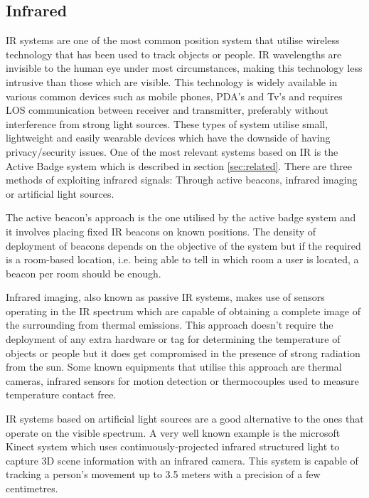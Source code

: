 \subsection{Infrared}
\label{subsec:ir}

\ac{IR} systems are one of the most common position system that utilise wireless technology that has been used to track objects or people. \ac{IR} wavelengths are invisible to the human eye under most circumstances, making this technology less intrusive than those which are visible. This technology is widely available in various common devices such as mobile phones, PDA's and Tv's and requires \ac{LOS} communication between receiver and transmitter, preferably without interference from strong light sources. These types of system utilise small, lightweight and easily wearable devices which have the downside of having privacy/security issues. One of the most relevant systems based on \ac{IR} is the Active Badge system which is described in section \ref{sec:related}. There are three methods of exploiting infrared signals: Through active beacons, infrared imaging or artificial light sources.

The active beacon's approach is the one utilised by the active badge system and it involves placing fixed \ac{IR} beacons on known positions. The density of deployment of beacons depends on the objective of the system but if the required is a room-based location, i.e. being able to tell in which room a user is located, a beacon per room should be enough.

Infrared imaging, also known as passive \ac{IR} systems, makes use of sensors operating in the \ac{IR} spectrum which are capable of obtaining a complete image of the surrounding from thermal emissions. This approach doesn’t require the deployment of any extra hardware or tag for determining the temperature of objects or people but it does get compromised in the presence of strong radiation from the sun. Some known equipments that utilise this approach are thermal cameras, infrared sensors for motion detection or thermocouples used to measure temperature contact free. 

\ac{IR} systems based on artificial light sources are a good alternative to the ones that operate on the visible spectrum. A very well known example is the microsoft Kinect system which uses continuously‐projected infrared structured light to capture 3D scene information	with an	infrared camera. This system is capable of tracking a person's movement up to 3.5 meters with a precision of a few centimetres. 


